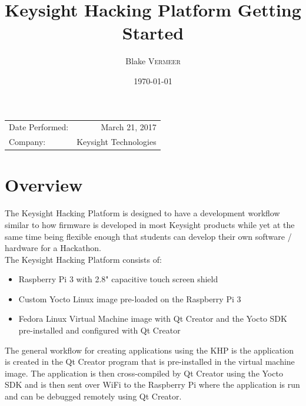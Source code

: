 \documentclass{article}
\title{Keysight Hacking Platform Getting Started} %
\author{Blake \textsc{Vermeer}} %
\date{\today} %
\begin{document}
\maketitle %

\begin{center}
\begin{tabular}{l r}
Date Performed: & March 21, 2017 \\ %
Company: & Keysight Technologies %
\end{tabular}
\end{center}


\section{Overview}

The Keysight Hacking Platform is designed to have a development workflow similar to how firmware is developed in most Keysight products while yet at the same time being flexible enough that students can develop their own software / hardware for a Hackathon. \\

The Keysight Hacking Platform consists of:

	\begin{itemize}
		
		\item Raspberry Pi 3 with 2.8" capacitive touch screen shield
		
		\item Custom Yocto Linux image pre-loaded on the Raspberry Pi 3
		
		\item Fedora Linux Virtual Machine image with Qt Creator and the Yocto SDK pre-installed and configured with Qt Creator
		
	\end{itemize}

The general workflow for creating applications using the KHP is the application is created in the Qt Creator program that is pre-installed in the virtual machine image. The application is then cross-compiled by Qt Creator using the Yocto SDK and is then sent over WiFi to the Raspberry Pi where the application is run and can be debugged remotely using Qt Creator.
\end{document}
